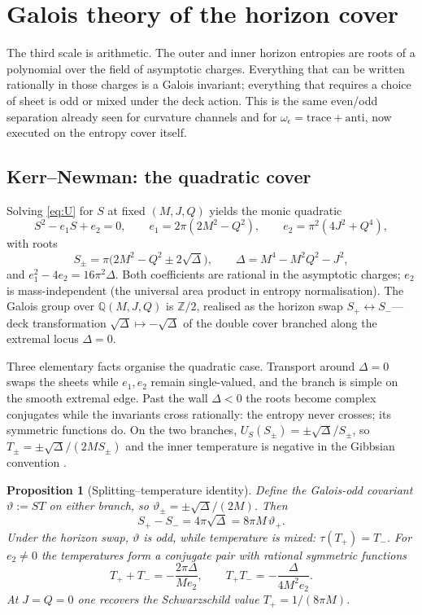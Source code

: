 \documentclass[11pt,a4paper]{article}
\newtheorem{proposition}[theorem]{Proposition}
\theoremstyle{definition}
\theoremstyle{remark}
\newcommand{\Q}{\mathbb{Q}}
\newcommand{\ZZ}{\mathbb{Z}}
\newcommand{\disc}{\Delta}
\begin{document}
\section{Galois theory of the horizon cover}
\label{sec:galois}

The third scale is arithmetic. The outer and inner horizon entropies are roots
of a polynomial over the field of asymptotic charges. Everything that can be
written rationally in those charges is a Galois invariant; everything that
requires a choice of sheet is odd or mixed under the deck action. This is the
same even/odd separation already seen for curvature channels and for
\(\omega_\epsilon=\text{trace}+\text{anti}\), now executed on the entropy cover
itself.

\subsection{Kerr--Newman: the quadratic cover}

Solving \eqref{eq:U} for \(S\) at fixed \((M,J,Q)\) yields the monic quadratic
\begin{equation}
S^2-e_1S+e_2=0,
\qquad
e_1=2\pi(2M^2-Q^2),
\qquad
e_2=\pi^2(4J^2+Q^4),
\label{eq:quadratic}
\end{equation}
with roots
\[
S_\pm=\pi\bigl(2M^2-Q^2\pm2\sqrt{\disc}\bigr),
\qquad
\disc=M^4-M^2Q^2-J^2,
\]
and \(e_1^2-4e_2=16\pi^2\disc\). Both coefficients are rational in the
asymptotic charges; \(e_2\) is mass-independent (the universal area product
\cite{AH,CGP2011} in entropy normalisation). The Galois group over
\(\Q(M,J,Q)\) is \(\ZZ/2\), realised as the horizon swap
\(S_+\leftrightarrow S_-\)---deck transformation
\(\sqrt{\disc}\mapsto-\sqrt{\disc}\) of the double cover branched along the
extremal locus \(\disc=0\).

Three elementary facts organise the quadratic case. Transport around
\(\disc=0\) swaps the sheets while \(e_1,e_2\) remain single-valued, and the
branch is simple on the smooth extremal edge. Past the wall \(\disc<0\) the
roots become complex conjugates while the invariants cross rationally: the
entropy never crosses; its symmetric functions do. On the two branches,
\(U_S(S_\pm)=\pm\sqrt{\disc}/S_\pm\), so
\(T_\pm=\pm\sqrt{\disc}/(2MS_\pm)\) and the inner temperature is negative in
the Gibbsian convention \cite{CGLP2018}.

\begin{proposition}[Splitting--temperature identity]
\label{prop:splitting}
Define the Galois-odd covariant \(\vartheta:=ST\) on either branch, so
\(\vartheta_\pm=\pm\sqrt{\disc}/(2M)\). Then
\[
S_+-S_-=4\pi\sqrt{\disc}=8\pi M\,\vartheta_+.
\]
Under the horizon swap, \(\vartheta\) is odd, while temperature is mixed:
\(\tau(T_+)=T_-\). For \(e_2\neq0\) the temperatures form a conjugate pair with
rational symmetric functions
\[
T_++T_-=-\frac{2\pi\disc}{M e_2},
\qquad
T_+T_-=-\frac{\disc}{4M^2e_2}.
\]
At \(J=Q=0\) one recovers the Schwarzschild value \(T_+=1/(8\pi M)\).
\end{proposition}
\end{document}
